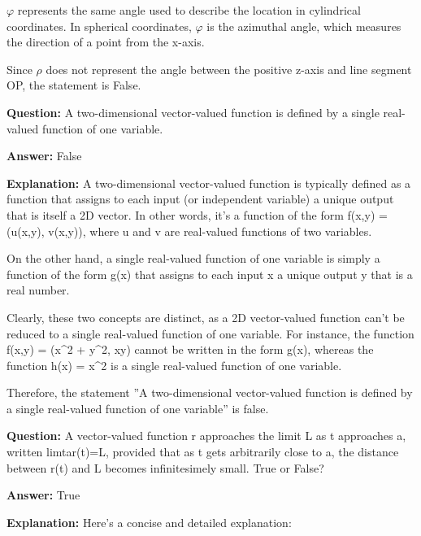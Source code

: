 \documentclass{article}
\begin{document}
\ensuremath{\varphi} represents the same angle used to describe the location in cylindrical coordinates. In spherical coordinates, \ensuremath{\varphi} is the azimuthal angle, which measures the direction of a point from the x-axis. 

Since \ensuremath{\rho} does not represent the angle between the positive z-axis and line segment OP, the statement is False.
                
                \vspace{0.5cm} 
        
            
                \textbf {Question:} A two-dimensional vector-valued function is defined by a single real-valued function of one variable.
                
                \textbf{Answer:} False

                \textbf{Explanation:} A two-dimensional vector-valued function is typically defined as a function that assigns to each input (or independent variable) a unique output that is itself a 2D vector. In other words, it's a function of the form f(x,y) = (u(x,y), v(x,y)), where u and v are real-valued functions of two variables.

On the other hand, a single real-valued function of one variable is simply a function of the form g(x) that assigns to each input x a unique output y that is a real number.

Clearly, these two concepts are distinct, as a 2D vector-valued function can't be reduced to a single real-valued function of one variable. For instance, the function f(x,y) = (x{\textasciicircum}2 + y{\textasciicircum}2, xy) cannot be written in the form g(x), whereas the function h(x) = x{\textasciicircum}2 is a single real-valued function of one variable.

Therefore, the statement ''A two-dimensional vector-valued function is defined by a single real-valued function of one variable'' is false.
                
                \vspace{0.5cm} 
        
            
                \textbf {Question:} A vector-valued function r approaches the limit L as t approaches a, written limt{\textrightarrow}ar(t)=L, provided that as t gets arbitrarily close to a, the distance between r(t) and L becomes infinitesimely small. True or False?
                
                \textbf{Answer:} True

                \textbf{Explanation:} Here's a concise and detailed explanation:
\end{document}
